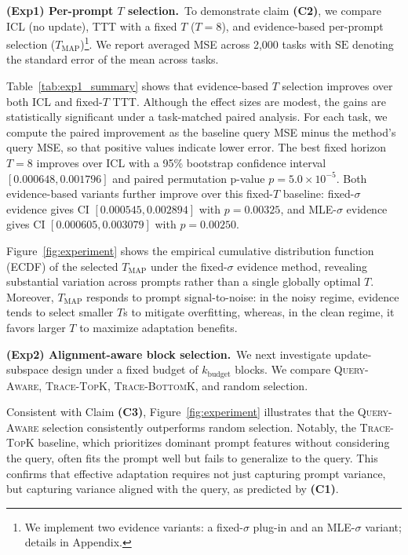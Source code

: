 \documentclass{article}
\theoremstyle{plain}
\theoremstyle{definition}
\theoremstyle{remark}
\begin{document}
\textbf{(Exp1) Per-prompt $T$ selection.}\,
To demonstrate claim \textbf{(C2)}, we compare ICL (no update), TTT with a fixed $T$ ($T=8$), and evidence-based per-prompt selection ($T_{\mathrm{MAP}}$)\footnote{We implement two evidence variants: a fixed-$\sigma$ plug-in and an MLE-$\sigma$ variant; details in Appendix.}. We report averaged MSE across 2{,}000 tasks with $\mathrm{SE}$ denoting the standard error of the mean across tasks.



Table~\ref{tab:exp1_summary} shows that evidence-based $T$ selection improves over both ICL and fixed-$T$ TTT. 
Although the effect sizes are modest, the gains are statistically significant under a task-matched paired analysis. 
For each task, we compute the paired improvement as the baseline query MSE minus the method's query MSE, so that positive values indicate lower error. 
The best fixed horizon $T{=}8$ improves over ICL with a 95\% bootstrap confidence interval $[0.000648,0.001796]$ and paired permutation p-value $p=5.0\times 10^{-5}$. 
Both evidence-based variants further improve over this fixed-$T$ baseline: fixed-$\sigma$ evidence gives CI $[0.000545,0.002894]$ with $p=0.00325$, and MLE-$\sigma$ evidence gives CI $[0.000605,0.003079]$ with $p=0.00250$.

Figure~\ref{fig:experiment} shows the empirical cumulative distribution function (ECDF) of the selected $T_{\mathrm{MAP}}$ under the fixed-$\sigma$ evidence method, revealing substantial variation across prompts rather than a single globally optimal $T$. 
Moreover, $T_{\mathrm{MAP}}$ responds to prompt signal-to-noise: in the noisy regime, evidence tends to select smaller $T$s to mitigate overfitting, whereas, in the clean regime, it favors larger $T$ to maximize adaptation benefits.

\textbf{(Exp2) Alignment-aware block selection.}\,
We next investigate update-subspace design under a fixed budget of $k_{\text{budget}}$ blocks. We compare \textsc{Query-Aware}, \textsc{Trace-TopK}, \textsc{Trace-BottomK}, and random selection.

Consistent with Claim \textbf{(C3)}, Figure~\ref{fig:experiment} illustrates that the \textsc{Query-Aware} selection consistently outperforms random selection. Notably, the \textsc{Trace-TopK} baseline, which prioritizes dominant prompt features without considering the query, often fits the prompt well but fails to generalize to the query. This confirms that effective adaptation requires not just capturing prompt variance, but capturing variance aligned with the query, as predicted by \textbf{(C1)}.
\end{document}
